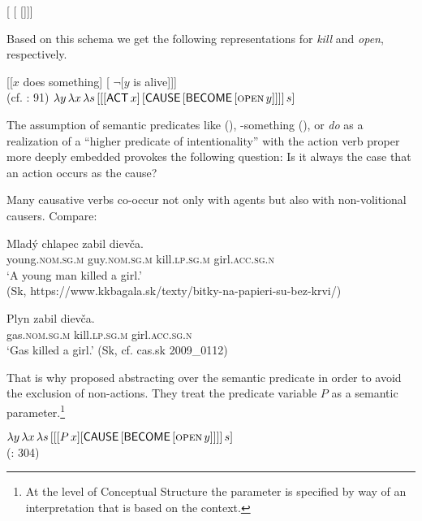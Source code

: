 \documentclass[output=paper]{langscibook}
\begin{document}
\ea%
    \label{ex:junghanns:19}
[ [ []]]
\z

\noindent Based on this schema we get the following representations for \textit{kill} and \textit{open}, respectively.

\ea%
    \label{ex:junghanns:20}
[[$x$ does something]  [ $\neg$[$y$ is alive]]]\\
  (cf. \citealt{Dowty1979}: 91)
\ex%
    \label{ex:junghanns:21}
 $\lambda y \, \lambda x \, \lambda s \, [[[\cnstx{act}\, x] \, [\cnstx{cause} \, [\cnstx{become} \, [\textsc{open}\, y]]]] \, s]$\\
  \citep[337]{Bierwisch2002}
\z

\noindent The assumption of semantic predicates like  (\citealt{Bierwisch2002,Bierwisch2005}), -something (\citealt{Dowty1979,Levin-MalkaRappaport1995}), or \textit{do} as a realization of a “higher predicate of intentionality” with the action verb proper more deeply embedded \citep{Ross1972} provokes the following question: Is it always the case that an action occurs as the cause?

Many causative verbs co-occur not only with agents but also with non-volitional causers. Compare:

\ea%
    \label{ex:junghanns:22}
  \ea \gll   Mladý chlapec zabil dievča.\\
    young.\textsc{nom.sg.m} guy.\textsc{nom.sg.m} kill.\textsc{lp.sg.m} girl.\textsc{acc.sg.n}\\
    \glt ‘A young man killed a girl.’ \\ \hfill(Sk, https://www.kkbagala.sk/texty/bitky-na-papieri-su-bez-krvi/)\label{ex:junghanns:22a}

  \ex \gll   Plyn zabil dievča.\\
    gas.\textsc{nom.sg.m} kill.\textsc{lp.sg.m} girl.\textsc{acc.sg.n}\\
    \glt ‘Gas killed a girl.’ \hfill (Sk, cf. cas.sk 2009\_0112)\label{ex:junghanns:22b}
\z
\z

\noindent That is why \citet[304]{Fehrmannetal2014} proposed abstracting over the semantic predicate in order to avoid the exclusion of non-actions. They treat the predicate variable $P$ as a semantic parameter.\footnote{At the level of Conceptual Structure the parameter is specified by way of an interpretation that is based on the context.}

\ea%
    \label{ex:junghanns:23}
 $\lambda y \, \lambda x \, \lambda s \, [[[P\, x] [\cnstx{cause} \, [\cnstx{become} \, [\textsc{open}\, y]]]] \, s]$\\
  (\citealt{Fehrmannetal2014}: 304)
\z
\end{document}
